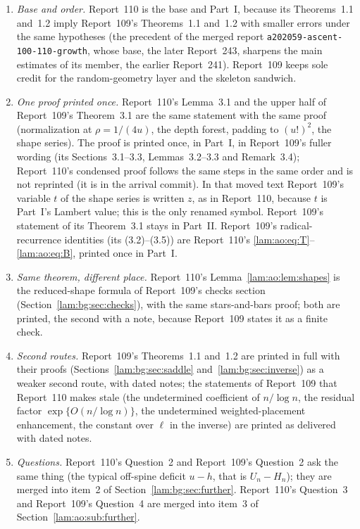 \documentclass[11pt,a4paper]{article}
\numberwithin{equation}{section}
\theoremstyle{remark}
\newcommand{\file}[1]{\nolinkurl{#1}}
\begin{document}
\begin{enumerate}
\item \emph{Base and order.} Report~110 is the base and Part~I, because its Theorems~1.1 and~1.2 imply Report~109's Theorems~1.1 and~1.2 with smaller errors under the same hypotheses (the precedent of the merged report \file{a202059-ascent-100-110-growth}, whose base, the later Report~243, sharpens the main estimates of its member, the earlier Report~241). Report~109 keeps sole credit for the random-geometry layer and the skeleton sandwich.
\item \emph{One proof printed once.} Report~110's Lemma~3.1 and the upper half of Report~109's Theorem~3.1 are the same statement with the same proof (normalization at $\rho=1/(4u)$, the depth forest, padding to $(u!)^2$, the shape series). The proof is printed once, in Part~I, in Report~109's fuller wording (its Sections~3.1--3.3, Lemmas~3.2--3.3 and Remark~3.4); Report~110's condensed proof follows the same steps in the same order and is not reprinted (it is in the arrival commit). In that moved text Report~109's variable $t$ of the shape series is written $z$, as in Report~110, because $t$ is Part~I's Lambert value; this is the only renamed symbol. Report~109's statement of its Theorem~3.1 stays in Part~II. Report~109's radical-recurrence identities (its (3.2)--(3.5)) are Report~110's \eqref{lam:ao:eq:T}--\eqref{lam:ao:eq:B}, printed once in Part~I.
\item \emph{Same theorem, different place.} Report~110's Lemma~\ref{lam:ao:lem:shapes} is the reduced-shape formula of Report~109's checks section (Section~\ref{lam:bg:sec:checks}), with the same stars-and-bars proof; both are printed, the second with a note, because Report~109 states it as a finite check.
\item \emph{Second routes.} Report~109's Theorems~1.1 and~1.2 are printed in full with their proofs (Sections~\ref{lam:bg:sec:saddle} and~\ref{lam:bg:sec:inverse}) as a weaker second route, with dated notes; the statements of Report~109 that Report~110 makes stale (the undetermined coefficient of $n/\log n$, the residual factor $\exp\{O(n/\log n)\}$, the undetermined weighted-placement enhancement, the constant over $\ell$ in the inverse) are printed as delivered with dated notes.
\item \emph{Questions.} Report~110's Question~2 and Report~109's Question~2 ask the same thing (the typical off-spine deficit $u-h$, that is $U_n-H_n$); they are merged into item~2 of Section~\ref{lam:bg:sec:further}. Report~110's Question~3 and Report~109's Question~4 are merged into item~3 of Section~\ref{lam:ao:sub:further}.

\end{enumerate}
\end{document}
